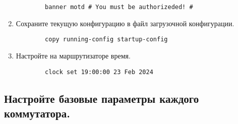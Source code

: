 \begin{enumerate}[a]
    \begin{verbatim}
        banner motd # You must be authorizeded! #
    \end{verbatim}
    \item Сохраните текущую конфигурацию в файл загрузочной конфигурации.
    \begin{verbatim}
        copy running-config startup-config
    \end{verbatim}
    \item Настройте на маршрутизаторе время.
    \begin{verbatim}
        clock set 19:00:00 23 Feb 2024
    \end{verbatim}
\end{enumerate}

\subsection{Настройте базовые параметры каждого коммутатора.}

